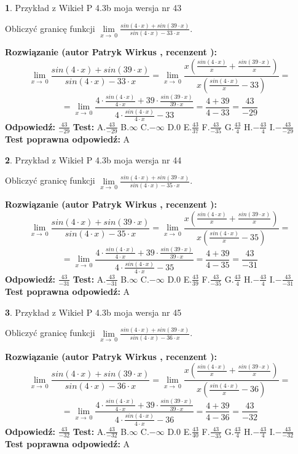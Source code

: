 \documentclass[12pt, a4paper]{article}
\theoremstyle{definition} %
\newtheorem{zad}{}
\newcommand{\zadStart}[1]{\begin{zad}#1\newline}
\newcommand{\zadStop}{\end{zad}}
\newcommand{\rozwStart}[2]{\noindent \textbf{Rozwiązanie (autor #1 , recenzent #2): }\newline}
\newcommand{\rozwStop}{\newline}
\newcommand{\odpStart}{\noindent \textbf{Odpowiedź:}\newline}
\newcommand{\odpStop}{\newline}
\newcommand{\testStart}{\noindent \textbf{Test:}\newline}
\newcommand{\testStop}{\newline}
\newcommand{\kluczStart}{\noindent \textbf{Test poprawna odpowiedź:}\newline}
\newcommand{\kluczStop}{\newline}
\begin{document}
\zadStart{Przykład z Wikieł P 4.3b moja wersja nr 43}


Obliczyć granicę funkcji $\lim\limits_{x\to\ 0}\frac{sin(4 \cdot x)+sin(39 \cdot x)}{sin(4 \cdot x)-33 \cdot x}$.
\zadStop
\rozwStart{Patryk Wirkus}{}
$$\lim\limits_{x\to\ 0}\frac{sin(4 \cdot x)+sin(39 \cdot x)}{sin(4 \cdot x)-33 \cdot x}=\lim\limits_{x\to\ 0}\frac{x(\frac{sin(4 \cdot x)}{x}+\frac{sin(39 \cdot x)}{x})}{x(\frac{sin(4 \cdot x)}{x}-33)}=$$
$$=\lim\limits_{x\to\ 0}\frac{4 \cdot \frac{sin(4 \cdot x)}{4 \cdot x}+39 \cdot \frac{sin(39 \cdot x)}{39 \cdot x}}{4 \cdot \frac{sin(4 \cdot x)}{4 \cdot x}-33}=\frac{4+39}{4-33} = \frac{43}{-29}$$
\rozwStop
\odpStart
$\frac{43}{-29}$
\odpStop
\testStart
A.$\frac{43}{-29}$
B.$\infty$
C.$-\infty$
D.$0$
E.$\frac{43}{37}$
F.$\frac{43}{-35}$
G.$\frac{43}{4}$
H.$-\frac{43}{4}$
I.$-\frac{43}{-29}$
\testStop
\kluczStart
A
\kluczStop



\zadStart{Przykład z Wikieł P 4.3b moja wersja nr 44}


Obliczyć granicę funkcji $\lim\limits_{x\to\ 0}\frac{sin(4 \cdot x)+sin(39 \cdot x)}{sin(4 \cdot x)-35 \cdot x}$.
\zadStop
\rozwStart{Patryk Wirkus}{}
$$\lim\limits_{x\to\ 0}\frac{sin(4 \cdot x)+sin(39 \cdot x)}{sin(4 \cdot x)-35 \cdot x}=\lim\limits_{x\to\ 0}\frac{x(\frac{sin(4 \cdot x)}{x}+\frac{sin(39 \cdot x)}{x})}{x(\frac{sin(4 \cdot x)}{x}-35)}=$$
$$=\lim\limits_{x\to\ 0}\frac{4 \cdot \frac{sin(4 \cdot x)}{4 \cdot x}+39 \cdot \frac{sin(39 \cdot x)}{39 \cdot x}}{4 \cdot \frac{sin(4 \cdot x)}{4 \cdot x}-35}=\frac{4+39}{4-35} = \frac{43}{-31}$$
\rozwStop
\odpStart
$\frac{43}{-31}$
\odpStop
\testStart
A.$\frac{43}{-31}$
B.$\infty$
C.$-\infty$
D.$0$
E.$\frac{43}{39}$
F.$\frac{43}{-35}$
G.$\frac{43}{4}$
H.$-\frac{43}{4}$
I.$-\frac{43}{-31}$
\testStop
\kluczStart
A
\kluczStop



\zadStart{Przykład z Wikieł P 4.3b moja wersja nr 45}


Obliczyć granicę funkcji $\lim\limits_{x\to\ 0}\frac{sin(4 \cdot x)+sin(39 \cdot x)}{sin(4 \cdot x)-36 \cdot x}$.
\zadStop
\rozwStart{Patryk Wirkus}{}
$$\lim\limits_{x\to\ 0}\frac{sin(4 \cdot x)+sin(39 \cdot x)}{sin(4 \cdot x)-36 \cdot x}=\lim\limits_{x\to\ 0}\frac{x(\frac{sin(4 \cdot x)}{x}+\frac{sin(39 \cdot x)}{x})}{x(\frac{sin(4 \cdot x)}{x}-36)}=$$
$$=\lim\limits_{x\to\ 0}\frac{4 \cdot \frac{sin(4 \cdot x)}{4 \cdot x}+39 \cdot \frac{sin(39 \cdot x)}{39 \cdot x}}{4 \cdot \frac{sin(4 \cdot x)}{4 \cdot x}-36}=\frac{4+39}{4-36} = \frac{43}{-32}$$
\rozwStop
\odpStart
$\frac{43}{-32}$
\odpStop
\testStart
A.$\frac{43}{-32}$
B.$\infty$
C.$-\infty$
D.$0$
E.$\frac{43}{40}$
F.$\frac{43}{-35}$
G.$\frac{43}{4}$
H.$-\frac{43}{4}$
I.$-\frac{43}{-32}$
\testStop
\kluczStart
A
\kluczStop
\end{document}
